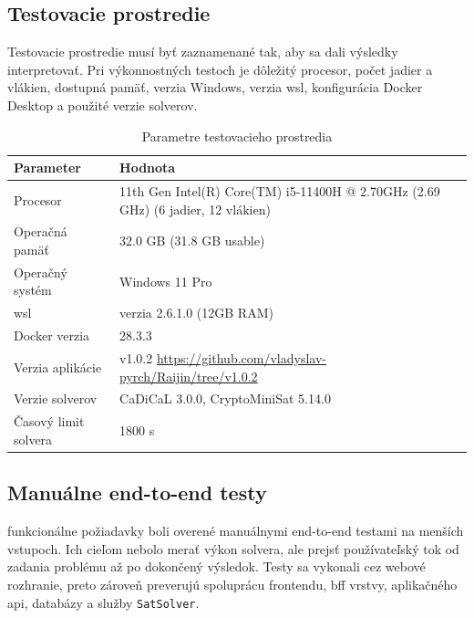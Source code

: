 \subsection{Testovacie prostredie}\label{sec:testing:environment}
Testovacie prostredie musí byť zaznamenané tak, aby sa dali výsledky interpretovať. Pri výkonnostných testoch je dôležitý procesor, počet jadier a vlákien, dostupná pamäť, verzia Windows, verzia \acrshort{wsl}, konfigurácia Docker Desktop a použité verzie solverov.

\begin{table}[H]
    \centering
    \caption{Parametre testovacieho prostredia}
    \label{tab:test-environment}
    \begin{tabular}{|p{}|p{}|}
        \hline
        Parameter            & Hodnota                                                                          \\
        \hline
        Procesor             & 11th Gen Intel(R) Core(TM) i5-11400H @ 2.70GHz (2.69 GHz) (6 jadier, 12 vlákien) \\
        \hline
        Operačná pamäť       & 32.0 GB (31.8 GB usable)                                                         \\
        \hline
        Operačný systém      & Windows 11 Pro                                                                   \\
        \hline
        \acrshort{wsl}       & verzia 2.6.1.0 (12GB RAM)                                                        \\
        \hline
        Docker verzia        & 28.3.3                                                                           \\
        \hline
        Verzia aplikácie     & v1.0.2 \url{https://github.com/vladyslav-pyrch/Raijin/tree/v1.0.2}               \\
        \hline
        Verzie solverov      & CaDiCaL 3.0.0, CryptoMiniSat 5.14.0                                              \\
        \hline
        Časový limit solvera & 1800 s                                                                           \\
        \hline
    \end{tabular}
\end{table}

\subsection{Manuálne end-to-end testy}\label{sec:testing:e2e}
funkcionálne požiadavky boli overené manuálnymi end-to-end testami na menších vstupoch. Ich cieľom nebolo merať výkon solvera, ale prejsť používateľský tok od zadania problému až po dokončený výsledok. Testy sa vykonali cez webové rozhranie, preto zároveň preverujú spoluprácu frontendu, \acrshort{bff} vrstvy, aplikačného \acrshort{api}, databázy a služby \texttt{SatSolver}.

